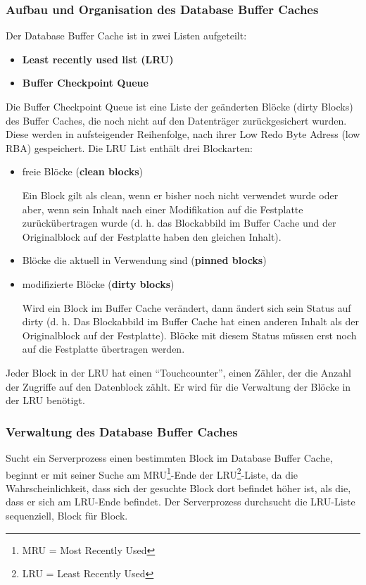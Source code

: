           \subsubsection{Aufbau und Organisation des Database Buffer Caches}
            Der Database Buffer Cache ist in zwei Listen aufgeteilt:
            \begin{itemize}
              \item \textbf{Least recently used list (LRU)}
              \item \textbf{Buffer Checkpoint Queue}
            \end{itemize}
						Die Buffer Checkpoint Queue ist eine Liste der ge\"anderten Bl\"ocke (dirty Blocks) des Buffer Caches, die noch nicht auf den Datentr\"ager zur\"uckgesichert wurden. Diese werden in aufsteigender Reihenfolge, nach ihrer Low Redo Byte Adress (low RBA) gespeichert.
\clearpage
            Die LRU List enth\"alt drei Blockarten:
            \begin{itemize}
              \item freie Bl\"ocke (\textbf{clean blocks})

              Ein Block gilt als clean, wenn er bisher noch nicht verwendet wurde oder aber, wenn sein Inhalt nach einer Modifikation auf die Festplatte zur\"uck\"ubertragen wurde (d. h. das Blockabbild im Buffer Cache und der Originalblock auf der Festplatte haben den gleichen Inhalt).
              \item Bl\"ocke die aktuell in Verwendung sind (\textbf{pinned blocks})
              \item modifizierte Bl\"ocke (\textbf{dirty blocks})

              Wird ein Block im Buffer Cache ver\"andert, dann \"andert sich sein Status auf dirty (d. h. Das Blockabbild im Buffer Cache hat einen anderen Inhalt als der Originalblock auf der Festplatte). Bl\"ocke mit diesem Status m\"ussen erst noch auf die Festplatte \"ubertragen werden.
            \end{itemize}


            Jeder Block in der LRU hat einen \enquote{Touchcounter}, einen Z\"ahler, der die Anzahl der Zugriffe auf den Datenblock z\"ahlt. Er wird f\"ur die Verwaltung der Bl\"ocke in der LRU ben\"otigt.
          \subsubsection{Verwaltung des Database Buffer Caches}
            Sucht ein Serverprozess einen bestimmten Block im Database Buffer Cache, beginnt er mit seiner Suche am MRU\footnote{MRU = Most Recently Used}-Ende der LRU\footnote{LRU = Least Recently Used}-Liste, da die Wahrscheinlichkeit, dass sich der gesuchte Block dort befindet h\"oher ist, als die, dass er sich am LRU-Ende befindet. Der Serverprozess durchsucht die LRU-Liste sequenziell, Block f\"ur Block.

